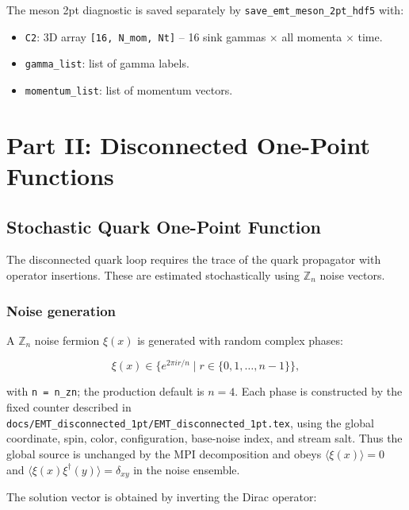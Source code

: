 \documentclass[11pt,a4paper]{article}
\newcommand{\znum}{\mathbb{Z}_n}
\newcommand{\code}[1]{\texttt{#1}}
\begin{document}
The meson 2pt diagnostic is saved separately by \code{save\_emt\_meson\_2pt\_hdf5} with:
\begin{itemize}[nosep]
  \item \code{C2}: 3D array \code{[16, N\_mom, Nt]} -- 16 sink gammas $\times$ all momenta $\times$ time.
  \item \code{gamma\_list}: list of gamma labels.
  \item \code{momentum\_list}: list of momentum vectors.
\end{itemize}


\section{Part II: Disconnected One-Point Functions}

\subsection{Stochastic Quark One-Point Function}
\label{sec:quark1pt}

The disconnected quark loop requires the trace of the quark propagator with operator insertions. These are estimated stochastically using $\znum$ noise vectors.

\subsubsection{Noise generation}

A $\znum$ noise fermion $\xi(x)$ is generated with random complex phases:

\begin{equation}\label{eq:zn_noise}
  \xi(x) \in \big\{ e^{2\pi i r / n} \mid r \in \{0, 1, \dots, n-1\} \big\},
\end{equation}

with \code{n = n\_zn}; the production default is $n=4$.  Each phase is
constructed by the fixed counter described in
\code{docs/EMT\_disconnected\_1pt/EMT\_disconnected\_1pt.tex}, using the
global coordinate, spin, color, configuration, base-noise index, and stream
salt.  Thus the global source is unchanged by the MPI decomposition and obeys
$\langle \xi(x) \rangle = 0$ and
$\langle \xi(x) \xi^\dagger(y) \rangle = \delta_{xy}$ in the noise ensemble.

The solution vector is obtained by inverting the Dirac operator:
\end{document}
